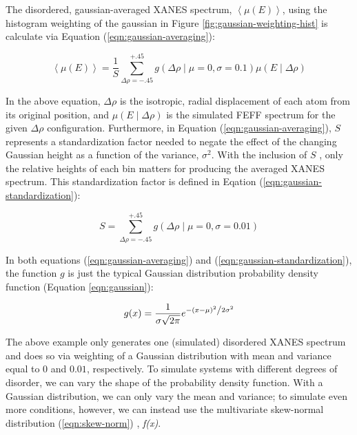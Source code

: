 The disordered, gaussian-averaged XANES spectrum, $ \left\langle \mu(E) \right\rangle $, using the histogram weighting of the gaussian in Figure \ref{fig:gaussian-weighting-hist} is calculate via Equation (\ref{eqn:gaussian-averaging}):

\begin{equation}
	\label{eqn:gaussian-averaging}
	\left\langle \mu(E) \right\rangle  = \frac{1}{S} \sum_{\Delta\rho=-.45}^{+.45} g\left(\Delta \rho \mid \mu=0, \sigma=0.1\right) \mu(E \mid \Delta\rho)
\end{equation}

\noindent
In the above equation, $ \Delta\rho $ is the isotropic, radial displacement of each atom from its original position, and $ \mu(E \mid \Delta\rho) $ is the simulated FEFF spectrum for the given $ \Delta\rho $ configuration. Furthermore, in Equation (\ref{eqn:gaussian-averaging}), $ S $ represents a standardization factor needed to negate the effect of the changing Gaussian height as a function of the variance, $ \sigma^2 $. With the inclusion of $ S $ , only the relative heights of each bin matters for producing the averaged XANES spectrum. This standardization factor is defined in Eqation (\ref{eqn:gaussian-standardization}):

\begin{equation}
	\label{eqn:gaussian-standardization}
	S = \sum_{\Delta\rho=-.45}^{+.45} g\left(\Delta \rho \mid \mu=0, \sigma=0.01\right)
\end{equation}

\noindent
In both equations (\ref{eqn:gaussian-averaging}) and (\ref{eqn:gaussian-standardization}), the function $ g $ is just the typical Gaussian distribution probability density function (Equation \ref{eqn:gaussian}): 

\begin{equation}
	\label{eqn:gaussian}
	g(x) = \frac{1}{{\sigma \sqrt {2\pi } }}e^{{{ - \left( {x - \mu } \right)^2 } \mathord{\left/ {\vphantom {{ - \left( {x - \mu } \right)^2 } {2\sigma ^2 }}} \right. \kern-\nulldelimiterspace} {2\sigma ^2 }}}
\end{equation}

The above example only generates one (simulated) disordered XANES spectrum and does so via weighting of a Gaussian distribution with mean and variance equal to $ 0 $ and $ 0.01 $, respectively. To simulate systems with different degrees of disorder, we can vary the shape of the probability density function. With a Gaussian distribution, we can only vary the mean and variance; to simulate even more conditions, however, we can instead use the multivariate skew-normal distribution (\ref{eqn:skew-norm}) \cite{skewnorm_Azzalini_1999, 2020SciPy-NMeth}, \textit{f(x)}.

